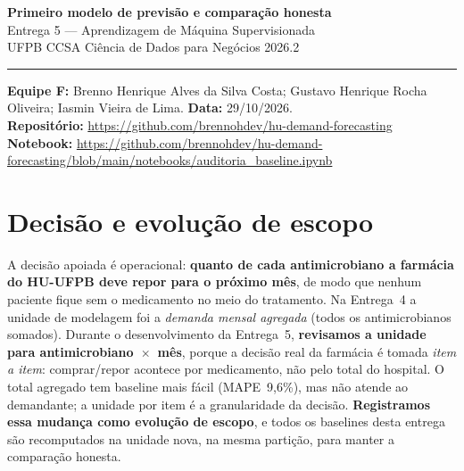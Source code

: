 \documentclass[11pt,a4paper]{article}
\begin{document}
\begin{center}
    {\LARGE\bfseries\color{azulmls} Primeiro modelo de previsão e comparação honesta}\\[3pt]
    {\large Entrega 5 --- Aprendizagem de Máquina Supervisionada}\\[2pt]
    {\normalsize UFPB \textperiodcentered{} CCSA \textperiodcentered{} Ciência de Dados para Negócios \textperiodcentered{} 2026.2}
\end{center}
\vspace{3pt}\hrule\vspace{6pt}

\noindent\textbf{Equipe F:} Brenno Henrique Alves da Silva Costa; Gustavo Henrique Rocha Oliveira; Iasmin Vieira de Lima. \quad \textbf{Data:} 29/10/2026.\\
\textbf{Repositório:} \url{https://github.com/brennohdev/hu-demand-forecasting}\\
\textbf{Notebook:} \url{https://github.com/brennohdev/hu-demand-forecasting/blob/main/notebooks/auditoria_baseline.ipynb}

\section{Decisão e evolução de escopo}
A decisão apoiada é operacional: \textbf{quanto de cada antimicrobiano a farmácia do HU-UFPB deve repor para o próximo mês}, de modo que nenhum paciente fique sem o medicamento no meio do tratamento. Na Entrega~4 a unidade de modelagem foi a \emph{demanda mensal agregada} (todos os antimicrobianos somados). Durante o desenvolvimento da Entrega~5, \textbf{revisamos a unidade para antimicrobiano~$\times$~mês}, porque a decisão real da farmácia é tomada \emph{item a item}: comprar/repor acontece por medicamento, não pelo total do hospital. O total agregado tem baseline mais fácil (MAPE~9,6\%), mas não atende ao demandante; a unidade por item é a granularidade da decisão. \textbf{Registramos essa mudança como evolução de escopo}, e todos os baselines desta entrega são recomputados na unidade nova, na mesma partição, para manter a comparação honesta.

\end{document}

